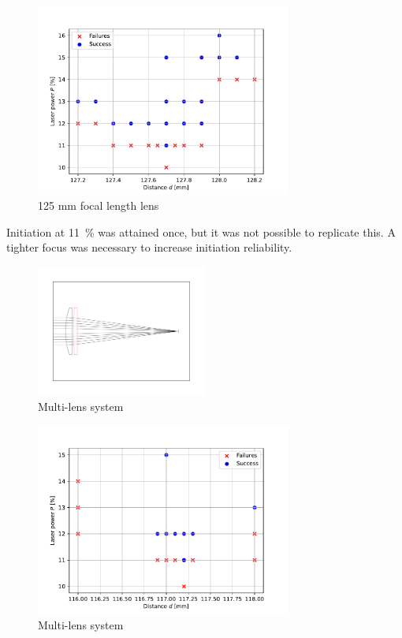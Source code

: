         \begin{figure}[!ht]
            \centering
            \includegraphics[width=0.75\textwidth]{assets/4 experiments/125mm_focus_threshold.pdf}
            \caption{125 mm focal length lens}
        \end{figure}
        
        Initiation at \qty{11}{\%} was attained once, but it was not possible to replicate this. A tighter focus was necessary to increase initiation reliability.

        \begin{figure}[!ht]
            \centering
            \includegraphics[width=0.5\textwidth]{assets/4 experiments/500 and 150 lenses.pdf}
            \caption{Multi-lens system}
        \end{figure}

        \begin{figure}[!ht]
            \centering
            \includegraphics[width=0.75\textwidth]{assets/4 experiments/duallens_focus_threshold.pdf}
            \caption{Multi-lens system}
        \end{figure}

